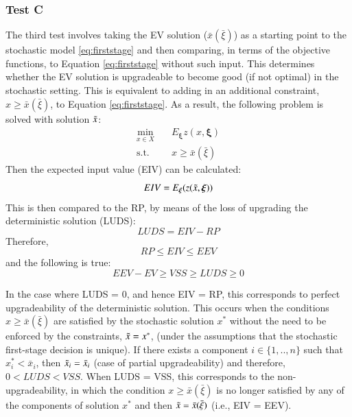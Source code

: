 \documentclass[../thesis.tex]{subfiles}
\begin{document}
{\subsubsection{Test C}\label{sec:TestC}
The third test involves taking the EV solution ($\bar x(\bar \xi)$) as a starting point to the stochastic model \eqref{eq:firststage} and then comparing, in terms of the objective functions, to Equation \eqref{eq:firststage} without such input. This determines whether the EV solution is upgradeable to become good (if not optimal) in the stochastic setting. This is equivalent to adding in an additional constraint, $x \geq \bar x (\bar \xi)
$, to Equation \eqref{eq:firststage}. As a result, the following problem is solved with solution $\Tilde{x}$:
\vspace{-.5cm}
\begin{align}
    \min_{x\in X}\enspace\enspace &E_{\boldsymbol{\xi}} z(x,\boldsymbol{\xi}) \\
    \text{s.t. } \enspace&x \geq \bar x(\bar \xi)
\end{align}
Then the expected input value (EIV) can be calculated:
\begin{equation}\label{eq:EIV}
    EIV = E_{\boldsymbol{\xi}}(z(\Tilde{x},\boldsymbol{\xi}))
\end{equation}
This is then compared to the RP, by means of the loss of upgrading the deterministic solution (LUDS):
\begin{equation}\label{eq:LUDS}
    LUDS = EIV - RP
\end{equation}
Therefore,
\begin{equation}
    RP \leq EIV \leq EEV
\end{equation}
and the following is true:
\begin{equation}
    EEV - EV \geq VSS \geq LUDS \geq 0
\end{equation}

In the case where LUDS = 0, and hence EIV = RP, this corresponds to perfect upgradeability of the deterministic solution. This occurs when the conditions $x \geq \bar x (\bar \xi)$ are satisfied by the stochastic solution $x^{*}$ without the need to be enforced by the constraints, $\Tilde{x} = x^{*}$, (under the assumptions that the stochastic first-stage decision is unique). If there exists a component $i \in \{1, .., n\}$ such that $x_{i}^{*} < \bar x_{i}$, then $\Tilde{x}_{i} = \bar x_{i}$ (case of partial upgradeability) and therefore, $0 < LUDS < VSS$. When LUDS = VSS, this corresponds to the non-upgradeability, in which the condition $x \geq \bar x (\bar \xi)$ is no longer satisfied by any of the components of solution $x^{*}$ and then $\Tilde{x} = \bar x (\bar \xi)$ (i.e., EIV = EEV).


}
\end{document}
